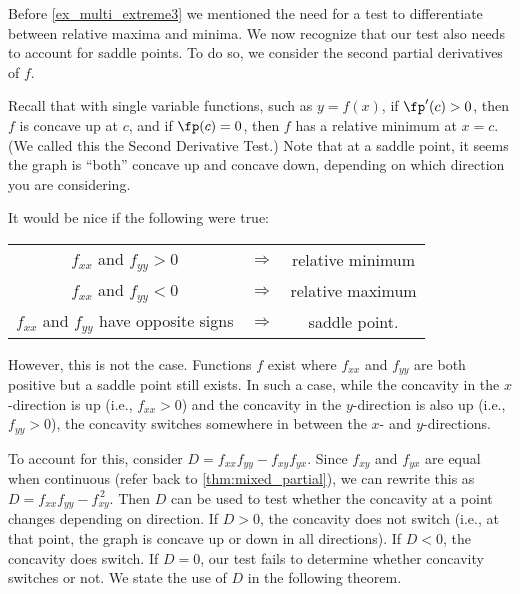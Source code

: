 Before \autoref{ex_multi_extreme3} we mentioned the need for a test to differentiate between relative maxima and minima. We now recognize that our test also needs to account for saddle points. To do so, we consider the second partial derivatives of $f$.

Recall that with single variable functions, such as $y=f(x)$, if $\fp'(c)>0$, then $f$ is concave up at $c$, and if $\fp(c) =0$, then $f$ has a relative minimum at $x=c$. (We called this the Second Derivative Test.) Note that at a saddle point, it seems the graph is ``both'' concave up and concave down, depending on which direction you are considering.

It would be nice if the following were true:
\begin{center}
	\begin{tabular}{ c c c }
	$f_{xx}$ and $f_{yy} >0$ & $\Rightarrow$ & relative minimum\\
	$f_{xx}$ and $f_{yy} <0$ & $\Rightarrow$ & relative maximum\\
	$f_{xx}$ and $f_{yy}$ have opposite signs & $\Rightarrow$ & saddle point.
	\end{tabular}
\end{center}

However, this is not the case. Functions $f$ exist where $f_{xx}$ and $f_{yy}$ are both positive  but a saddle point still exists. In such a case, while the concavity in the $x$-direction is up (i.e., $f_{xx}>0$) and the concavity in the $y$-direction is also up (i.e., $f_{yy}>0$), the concavity switches somewhere in between the $x$- and $y$-directions.

To account for this, consider $D = f_{xx}f_{yy}-f_{xy}f_{yx}$. Since $f_{xy}$ and $f_{yx}$ are equal when continuous (refer back to \autoref{thm:mixed_partial}), we can rewrite this as $D = f_{xx}f_{yy}-f_{xy}^{\,2}$. Then $D$ can be used to test whether the concavity at a point changes depending on direction. If $D>0$, the concavity does not switch (i.e., at that point, the graph is concave up or down in all directions). If $D<0$, the concavity does switch. If $D=0$, our test fails to determine whether concavity switches or not. We state the use of $D$ in the following theorem.

